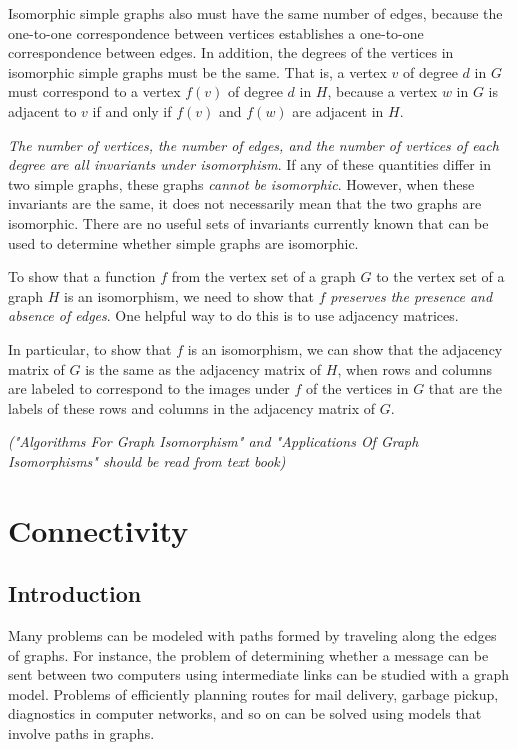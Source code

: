 \documentclass[11pt]{article}
\begin{document}
Isomorphic simple graphs also must have the same number of edges, because the one-to-one correspondence between vertices establishes a one-to-one correspondence between edges. In addition, the degrees of the vertices in isomorphic simple graphs must be the same. That is, a vertex $v$ of degree $d$ in $G$ must correspond to a vertex $f(v)$ of degree $d$ in $H$, because a vertex
$w$ in $G$ is adjacent to $v$ if and only if $f(v)$ and $f(w)$ are adjacent in $H$.

\textit{The number of vertices, the number of edges, and the number of vertices of each degree are all invariants under isomorphism}. If any of these quantities differ in two simple graphs, these graphs \textit{cannot be isomorphic}. However, when these invariants are the same, it does not necessarily mean that the two graphs are isomorphic. There are no useful sets of invariants currently known that can be used to determine whether simple graphs are isomorphic.

To show that a function $f$ from the vertex set of a graph $G$ to the vertex set of a graph $H$ is an isomorphism, we need to show that $f$ \textit{preserves the presence and absence of edges}. One helpful way to do this is to use adjacency matrices. 

In particular, to show that $f$ is an isomorphism, we can show that the adjacency matrix of $G$ is the same as the adjacency matrix of $H$, when rows and columns are labeled to correspond to the images under $f$ of the vertices in $G$ that are the labels of these rows and columns in the adjacency matrix of $G$.

\textit{("Algorithms For Graph Isomorphism" and "Applications Of Graph Isomorphisms" should be read from text book)}


\section{Connectivity}

\subsection{Introduction}

Many problems can be modeled with paths formed by traveling along the edges of graphs. For instance, the problem of determining whether a message can be sent between two computers using intermediate links can be studied with a graph model. Problems of efficiently planning routes for mail delivery, garbage pickup, diagnostics in computer networks, and so on can be solved using models that involve paths in graphs.
\end{document}
